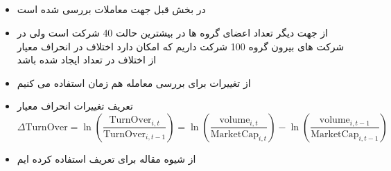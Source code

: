 \documentclass[12pt, a4paper]{article}
\begin{document}
 \subsection{}
\begin{itemize}
	\item 
	در بخش قبل جهت معاملات بررسی شده است
	\item 
	از جهت دیگر تعداد اعضای گروه ها در بیشترین حالت 40 شرکت است ولی در شرکت های بیرون گروه 100 شرکت داریم که امکان دارد اختلاف در انحراف معیار از اختلاف در تعداد ایجاد شده باشد
	\item 
	از تغییرات 
	برای بررسی معامله هم زمان استفاده می کنیم
	\item 
	تعریف تغییرات انحراف معیار
	\begin{equation}
			\Delta \text{TurnOver} = \ln(\frac{\text{TurnOver}_{i,t}}{\text{TurnOver}_{i,t-1}}) = 
		\ln({\frac{\text{volume}_{i,t}}{\text{MarketCap}_{i,t}}}) - \ln({\frac{\text{volume}_{i,t-1}}{\text{MarketCap}_{i,t-1}}})
	\end{equation}
	\item 
	از شیوه مقاله 
	برای تعریف استفاده کرده ایم
\end{itemize}
\end{document}
